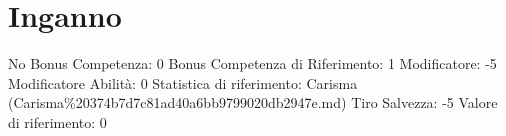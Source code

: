 \section{Inganno}\label{inganno}

\begin{description}
\tightlist
\item[Tags: ABI]
No Bonus Competenza: 0 Bonus Competenza di Riferimento: 1 Modificatore:
-5 Modificatore Abilità: 0 Statistica di riferimento: Carisma
(Carisma\%20374b7d7c81ad40a6bb9799020db2947e.md) Tiro Salvezza: -5
Valore di riferimento: 0
\end{description}

